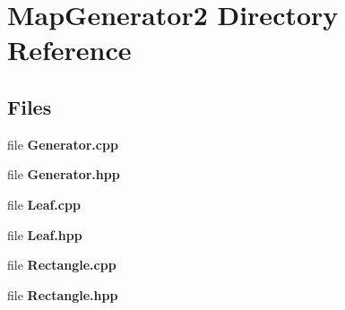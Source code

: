 \section{Map\-Generator2 Directory Reference}
\label{dir_3a438b560038d25882c32ee5ca9d86a9}
\subsection*{Files}
\begin{DoxyCompactItemize}
\item 
file {\bf Generator.\-cpp}
\item 
file {\bf Generator.\-hpp}
\item 
file {\bf Leaf.\-cpp}
\item 
file {\bf Leaf.\-hpp}
\item 
file {\bf Rectangle.\-cpp}
\item 
file {\bf Rectangle.\-hpp}
\end{DoxyCompactItemize}
